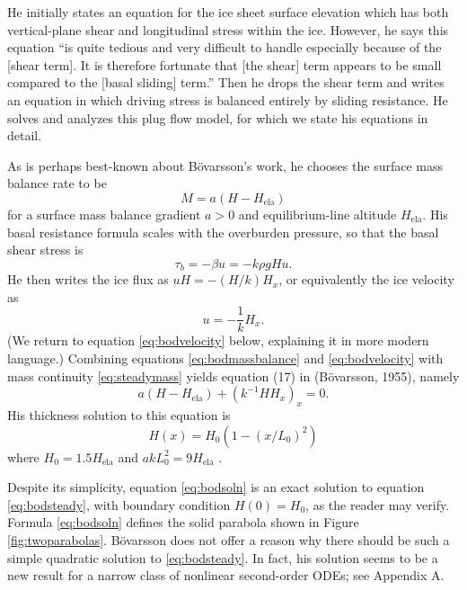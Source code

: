 \documentclass[twocolumn,letterpaper]{igs}
\renewcommand{\dh}{\fontencoding{T1}\selectfont{\symbol{240}}}
\newcommand{\bod}{B\"o\dh varsson\xspace}
\newcommand{\citepbod}{(B\"o\dh varsson, 1955)\nocite{Bodvardsson}\xspace}
\newcommand{\Hela}{H_{\text{ela}}}
\begin{document}
He initially states an equation for the ice sheet surface elevation which has both vertical-plane shear and longitudinal stress within the ice.  However, he says this equation ``is quite tedious and very difficult to handle especially because of the [shear term].  It is therefore fortunate that [the shear] term appears to be small compared to the [basal sliding] term.''  Then he drops the shear term and writes an equation in which driving stress is balanced entirely by sliding resistance.  He solves and analyzes this plug flow model, for which we state his equations in detail.

As is perhaps best-known about \bod's work, he chooses the surface mass balance rate to be
\begin{equation}
M = a (H - \Hela)  \label{eq:bodmassbalance}
\end{equation}
for a surface mass balance gradient $a>0$ and equilibrium-line altitude $\Hela$.  His basal resistance formula scales with the overburden pressure, so that the basal shear stress is
\begin{equation}
\tau_b = - \beta u = - k \rho g H u.  \label{eq:bodstresschoice}
\end{equation}
He then writes the ice flux as $uH=-(H/k) H_x$, or equivalently the ice velocity as
\begin{equation}
u = - \frac{1}{k} H_x. \label{eq:bodvelocity}
\end{equation}
(We return to equation \eqref{eq:bodvelocity} below, explaining it in more modern language.)  Combining equations \eqref{eq:bodmassbalance} and \eqref{eq:bodvelocity} with mass continuity \eqref{eq:steadymass} yields equation (17) in \citepbod, namely
\begin{equation}
a (H - \Hela) + (k^{-1} H H_x)_x = 0.  \label{eq:bodsteady}
\end{equation}
His thickness solution to this equation is \citep[equations (18) and (23)]{Bodvardsson}
\begin{equation}
H(x) = H_0 (1 - (x/L_0)^2)  \label{eq:bodsoln}
\end{equation}
where $H_0 = 1.5 \Hela$ and $a k L_0^2 = 9 \Hela$ \citep[equation (24)]{Bodvardsson}.

Despite its simplicity, equation \eqref{eq:bodsoln} is an exact solution to equation \eqref{eq:bodsteady}, with boundary condition $H(0)=H_0$, as the reader may verify.  Formula \eqref{eq:bodsoln} defines the solid parabola shown in Figure \ref{fig:twoparabolas}.  \bod does not offer a reason why there should be such a simple quadratic solution to \eqref{eq:bodsteady}.  In fact, his solution seems to be a new result for a narrow class of nonlinear second-order ODEs; see Appendix A.
\end{document}
